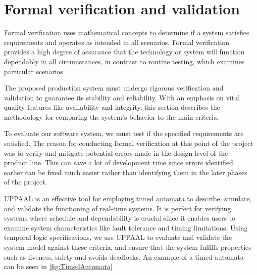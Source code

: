 \section{Formal verification and validation}
\label{sec:formal_v_and_v}
Formal verification uses mathematical concepts to determine if a system satisfies requirements and operates as intended in all scenarios. Formal verification provides a high degree of assurance that the technology or system will function dependably in all circumstances, in contrast to routine testing, which examines particular scenarios. 

The proposed production system must undergo rigorous verification and validation  to guarantee its stability and reliability. With an emphasis on vital quality features like availability and integrity, this section describes the methodology for comparing the system's behavior to the main criteria.\cite{formalverification}

To evaluate our software system, we must test if the specified requirements are satisfied. The reason for conducting formal verification at this point of the project was to verify and mitigate potential errors made in the design level of the product line. This can save a lot of development time since errors identified earlier can be fixed much easier rather than identifying them in the later phases of the project.

UPPAAL is an effective tool for employing timed automata to describe, simulate, and validate the functioning of real-time systems. It is perfect for verifying systems where schedule and dependability is crucial since it enables users to examine system characteristics like fault tolerance and timing limitations. Using temporal logic specifications, we use UPPAAL to evaluate and validate the system model against these criteria, and ensure that the system fulfills properties such as liveness, safety and avoids deadlocks.\cite{Uppaal} An example of a timed automata can be seen in \ref{fig:TimedAutomata}





